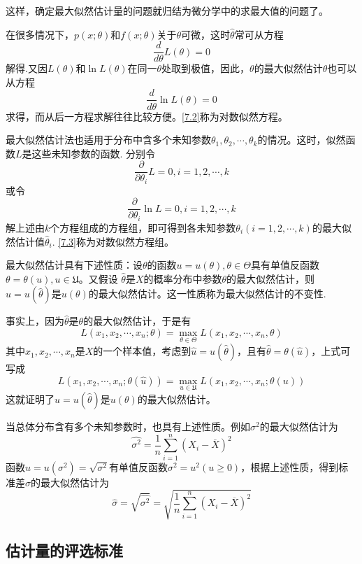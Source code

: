 \begin{definition}[最大似然估计法]
    这样，确定最大似然估计量的问题就归结为微分学中的求最大值的问题了。

    在很多情况下，$p(x;\theta)$和$f(x;\theta)$关于$\theta$可微，这时$\hat{\theta}$常可从方程
    $$\frac{d}{d\theta}L(\theta)=0$$
    解得.又因$L(\theta)$和$\ln L(\theta)$在同一$\theta$处取到极值，因此，$\theta$的最大似然估计$\theta$也可以从方程
    \begin{equation}\tag{2}\label{7.2}
    \frac{d}{d\theta} \ln L(\theta)=0
    \end{equation}
    求得，而从后一方程求解往往比较方便。\eqref{7.2}称为{\heiti 对数似然方程}。

    最大似然估计法也适用于分布中含多个未知参数$\theta_1,\theta_2,\cdots,\theta_k$的情况。这时，似然函数$L$是这些未知参数的函数.
    分别令
    $$\frac{\partial}{\partial \theta_i}L=0,i=1,2,\cdots,k$$
    或令
    \begin{equation}\tag{3}\label{7.3}
    \frac{\partial}{\partial \theta_i}\ln L=0,i=1,2,\cdots,k
    \end{equation}
    解上述由$k$个方程组成的方程组，即可得到各未知参数$\theta_i(i=1,2,\cdots,k)$的最大似然估计值$\hat{\theta}_i$.
    \eqref{7.3}称为{\heiti 对数似然方程组}。
\end{definition}

\begin{theorem}
    最大似然估计具有下述性质：设$\theta$的函数$u=u(\theta),\theta\in \varTheta$具有单值反函数$\theta=\theta(u),u\in \mathfrak{U}$。又假设
    $\hat{\theta}$是$X$的概率分布中参数$\theta$的最大似然估计，则$\hat{u}=u(\hat{\theta})$是$u(\theta)$的最大似然估计。这一性质称为最大似然估计的{\heiti 不变性}.

    事实上，因为$\hat{\theta}$是$\theta$的最大似然估计，于是有
    $$L(x_1,x_2,\cdots,x_n;\theta)=\max\limits_{\theta\in \varTheta}L(x_1,x_2,\cdots,x_n,\theta)$$
    其中$x_1,x_2,\cdots,x_n$是$X$的一个样本值，考虑到$\hat{u}=u(\hat{\theta})$，且有$\hat{\theta}=\theta(\hat{u})$，上式可写成
    $$L(x_1,x_2,\cdots,x_n;\theta(\hat{u}))=\max\limits_{u\in \mathfrak{U}}L(x_1,x_2,\cdots,x_n;\theta(u))$$
    这就证明了$\hat{u}=u(\hat{\theta})$是$u(\theta)$的最大似然估计。

    当总体分布含有多个未知参数时，也具有上述性质。例如$\sigma^2$的最大似然估计为
    $$\hat{\sigma^2}=\frac{1}{n}\sum_{i=1}^n{(X_i-\overline{X})}^2$$
    函数$u=u(\sigma^2)=\sqrt{\sigma^2}$有单值反函数$\sigma^2=u^2(u\geq 0)$，根据上述性质，得到标准差$\sigma$的最大似然估计为
    $$\hat{\sigma}=\sqrt{\hat{\sigma^2}}=\sqrt{\frac{1}{n}\sum_{i=1}^n{(X_i-\overline{X})}^2}$$
\end{theorem}

\subsection{估计量的评选标准}